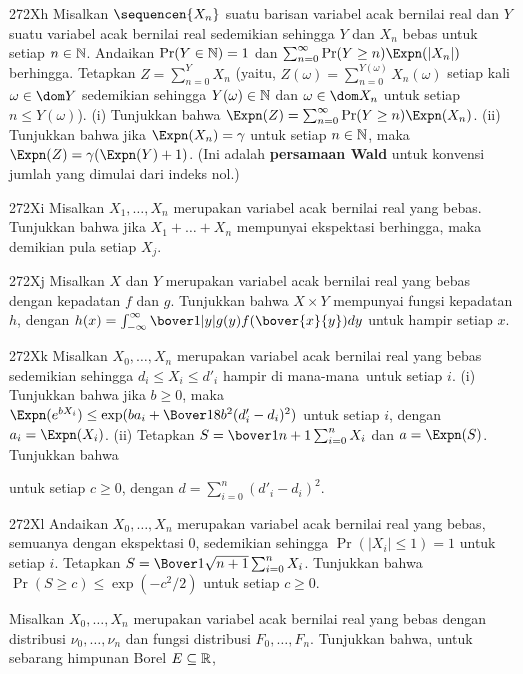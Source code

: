 {\spheader 272Xh Misalkan $\sequencen{X_n}$ suatu barisan variabel acak
bernilai real dan $Y$ suatu variabel acak bernilai real sedemikian
sehingga $Y$ dan $X_n$ bebas untuk setiap $n\in\Bbb N$. Andaikan
$\Pr(Y\in\Bbb N)=1$ dan
$\sum_{n=0}^{\infty}\Pr(Y\ge n)\Expn(|X_n|)$ berhingga. Tetapkan
$Z=\sum_{n=0}^YX_n$ (yaitu,
$Z(\omega)=\sum_{n=0}^{Y(\omega)}X_n(\omega)$ setiap kali
$\omega\in\dom Y$ sedemikian sehingga $Y(\omega)\in\Bbb N$ dan
$\omega\in\dom X_n$ untuk setiap $n\le Y(\omega)$). (i) Tunjukkan bahwa
$\Expn(Z)=\sum_{n=0}^{\infty}\Pr(Y\ge n)\Expn(X_n)$. 
(ii) Tunjukkan bahwa jika $\Expn(X_n)=\gamma$ untuk setiap $n\in\Bbb N$,
maka $\Expn(Z)=\gamma(\Expn(Y)+1)$. (Ini adalah {\bf persamaan Wald}
untuk konvensi jumlah yang dimulai dari indeks nol.)

\sqheader 272Xi Misalkan $X_1,\ldots,X_n$ merupakan variabel acak
bernilai real yang bebas. Tunjukkan bahwa jika
$X_1+\ldots+X_n$ mempunyai ekspektasi berhingga, maka demikian pula
setiap $X_j$. 

\sqheader 272Xj Misalkan $X$ dan $Y$ merupakan variabel acak bernilai
real yang bebas dengan kepadatan $f$ dan $g$. Tunjukkan bahwa
$X\times Y$ mempunyai fungsi kepadatan $h$, dengan
$h(x)=\int_{-\infty}^{\infty}\bover1{|y|}g(y)f(\bover{x}{y})dy$ untuk
hampir setiap $x$. 

\spheader 272Xk Misalkan
$X_0,\ldots,X_n$ merupakan variabel acak bernilai real yang bebas
sedemikian sehingga $d_i\le X_i\le d'_i$ hampir di mana-mana\
untuk setiap $i$. (i) Tunjukkan bahwa jika $b\ge 0$, maka
$\Expn(e^{bX_i})\le\exp(ba_i+\Bover18b^2(d'_i-d_i)^2)$ untuk setiap $i$,
dengan $a_i=\Expn(X_i)$. (ii)
Tetapkan $S=\bover1{n+1}\sum_{i=0}^nX_i$ dan $a=\Expn(S)$. Tunjukkan
bahwa


\noindent untuk setiap $c\ge 0$, dengan
$d=\sum_{i=0}^n(d'_i-d_i)^2$.

\spheader 272Xl Andaikan
$X_0,\ldots,X_n$ merupakan variabel acak bernilai real yang bebas,
semuanya dengan ekspektasi $0$, sedemikian sehingga
$\Pr(|X_i|\le 1)=1$ untuk setiap $i$. Tetapkan
$S=\Bover1{\sqrt{n+1}}\sum_{i=0}^nX_i$. Tunjukkan bahwa
$\Pr(S\ge c)\le\exp(-c^2/2)$ untuk setiap $c\ge 0$.

Misalkan $X_0,\ldots,X_n$ merupakan variabel acak bernilai real yang
bebas dengan distribusi $\nu_0,\ldots,\nu_n$ dan fungsi distribusi
$F_0,\ldots,F_n$. Tunjukkan bahwa, untuk sebarang himpunan Borel
$E\subseteq\Bbb R$,

}
